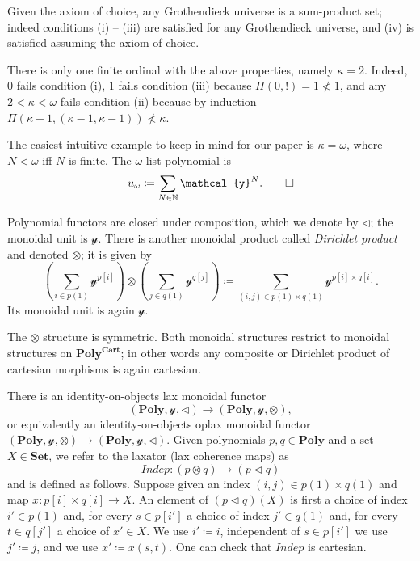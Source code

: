 \documentclass[11pt, one side, article]{memoir}
\theoremstyle{definition}
\theoremstyle{plain}
\newenvironment{example}
  {\pushQED{\qed}\renewcommand{\qedsymbol}{$\lozenge$}\examplex}
  {\popQED\endexamplex}
\newcommand{\Cat}[1]{\mathbf{#1}}%
\newcommand{\Fun}[1]{\mathit{#1}}%
\newcommand{\nn}{\mathbb{N}}
\newcommand{\smset}{\Cat{Set}}
\newcommand{\yon}{\mathcal{y}}
\newcommand{\poly}{\Cat{Poly}}
\newcommand{\polycart}{\poly^{\Cat{Cart}}}
\newcommand{\0}{\textsf{0}}
\newcommand{\1}{\tn{\textsf{1}}}
\newcommand{\tri}{\mathbin{\triangleleft}}
\newcommand{\indep}{\Fun{Indep}}
\begin{document}
\begin{example}\label{ex.sum_prod_set}
Given the axiom of choice, any Grothendieck universe is a sum-product set; indeed conditions (i) -- (iii) are satisfied for any Grothendieck universe, and (iv) is satisfied assuming the axiom of choice.

There is only one finite ordinal with the above properties, namely $\kappa=2$. Indeed, $0$ fails condition (i), $1$ fails condition (iii) because $\Pi(0,!)=1\not<1$, and any $2<\kappa<\omega$ fails condition (ii) because by induction $\Pi(\kappa-1,(\kappa-1,\kappa-1))\not<\kappa$.

The easiest intuitive example to keep in mind for our paper is $\kappa=\omega$, where $N<\omega$ iff $N$ is finite. The $\omega$-list polynomial is
\[
  u_\omega\coloneqq\sum_{N\in\nn}\yon^N.
\qedhere
\]
\end{example}


Polynomial functors are closed under composition, which we denote by $\tri$; the monoidal unit is $\yon$. There is another monoidal product called \emph{Dirichlet product} and denoted $\otimes$; it is given by
\[
\left(\sum_{i\in p(1)}\yon^{p[i]}\right)\otimes
\left(\sum_{j\in q(1)}\yon^{q[j]}\right)\coloneqq
\sum_{(i,j)\in p(1)\times q(1)}\yon^{p[i]\times q[i]}.
\]
Its monoidal unit is again $\yon$. 

The $\otimes$ structure is symmetric. Both monoidal structures restrict to monoidal structures on $\polycart$; in other words any composite or Dirichlet product of cartesian morphisms is again cartesian.

There is an identity-on-objects lax monoidal functor
\begin{equation}\label{eqn.indep}
(\poly,\yon,\tri)\to(\poly,\yon,\otimes),
\end{equation}
or equivalently an identity-on-objects oplax monoidal functor $(\poly,\yon,\otimes)\to(\poly,\yon,\tri)$. Given polynomials $p,q\in\poly$ and a set $X\in\smset$, we refer to the laxator (lax coherence maps) as
\[\indep\colon (p\otimes q)\to (p\tri q)\]
and is defined as follows. Suppose given an index $(i,j)\in p(1)\times q(1)$ and map $x\colon p[i]\times q[i]\to X$. An element of $(p\tri q)(X)$ is first a choice of index $i'\in p(1)$ and, for every $s\in p[i']$ a choice of index $j'\in q(1)$ and, for every $t\in q[j']$ a choice of $x'\in X$. We use $i'\coloneqq i$, independent of $s\in p[i']$ we use $j'\coloneqq j$, and we use $x'\coloneqq x(s,t)$. One can check that $\indep$ is cartesian.
\end{document}
